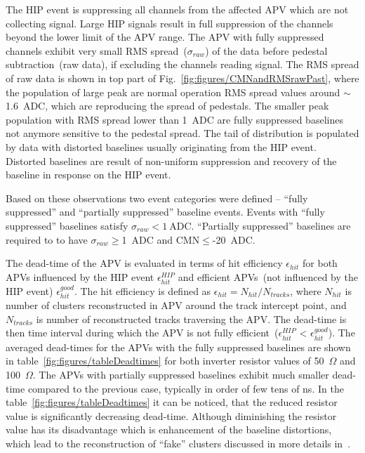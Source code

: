 The HIP event is suppressing all channels from the affected APV which are not collecting signal. Large HIP signals result in full suppression of the channels beyond the lower limit of the APV range. The APV with fully suppressed channels exhibit very small RMS spread~($\sigma_{raw}$) of the data before pedestal subtraction~(raw data), if excluding the channels reading signal. The RMS spread of raw data is shown in top part of Fig.~\ref{fig:figures/CMNandRMSrawPast}, where the population of large peak are normal operation RMS spread values around $\sim$1.6~ADC, which are reproducing the spread of pedestals. The smaller peak population with RMS spread lower than 1~ADC are fully suppressed baselines not anymore sensitive to the pedestal spread. The tail of distribution is populated by data with distorted baselines usually originating from the HIP event. Distorted baselines are result of non-uniform suppression and recovery of the baseline in response on the HIP event.

Based on these observations two event categories were defined -- ``fully suppressed'' and ``partially suppressed'' baseline events. Events with ``fully suppressed'' baselines satisfy $\sigma_{raw}< 1~\mathrm{ADC}$. ``Partially suppressed'' baselines are required to to have $\sigma_{raw}\geq$1~ADC and CMN$\leq$-20~ADC.


The dead-time of the APV is evaluated in terms of hit efficiency $\epsilon_{hit}$ for both APVs influenced by the HIP event $\epsilon_{hit}^{HIP}$ and efficient APVs~(not influenced by the HIP event) $\epsilon_{hit}^{good}$. The hit efficiency is defined as $\epsilon_{hit} = N_{hit}/N_{tracks}$, where $N_{hit}$ is number of clusters reconstructed in APV around the track intercept point, and $N_{tracks}$ is number of reconstructed tracks traversing the APV. The dead-time is then time interval during which the APV is not fully efficient~($\epsilon_{hit}^{HIP}$ < $\epsilon_{hit}^{good}$). The averaged dead-times for the APVs with the fully suppressed baselines are shown in table~\ref{fig:figures/tableDeadtimes} for both inverter resistor values of 50~$\Omega$ and 100~$\Omega$. The APVs with partially suppressed baselines exhibit much smaller dead-time compared to the previous case, typically in order of few tens of ns. In the table~\ref{fig:figures/tableDeadtimes} it can be noticed, that the reduced resistor value is significantly decreasing dead-time. Although diminishing the resistor value has its disadvantage which is enhancement of the baseline distortions, which lead to the reconstruction of ``fake'' clusters discussed in more details in~\cite{Bainbridge:2004jc}.

